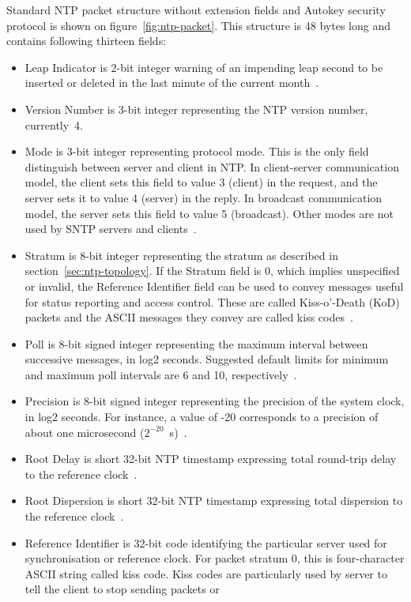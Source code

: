Standard NTP packet structure without extension fields and
Autokey security protocol is shown on figure~\ref{fig:ntp-packet}.
This structure is 48 bytes long and contains following thirteen fields:
\begin{itemize}
\item
Leap Indicator is 2-bit integer warning of an impending leap
second to be inserted or deleted in the last minute of the current
month~\cite{rfc5905}.
\item
Version Number is 3-bit integer representing the NTP
version number, currently~4.
\item
Mode is 3-bit integer representing protocol mode.
This is the only field distinguish between server and client in NTP.
In client-server communication model, the client sets this field to value 3 (client) in the request,
and the server sets it to value 4 (server) in the reply.
In broadcast communication model, the server sets this field to value 5 (broadcast).
Other modes are not used by SNTP servers and clients~\cite{rfc4330}.
\item
Stratum is 8-bit integer representing the stratum as described in section~\ref{sec:ntp-topology}.
If the Stratum field is 0, which implies unspecified or invalid, the
Reference Identifier field can be used to convey messages useful for
status reporting and access control.
These are called Kiss-o'-Death (KoD)
packets and the ASCII messages they convey are called kiss codes~\cite{rfc5905}.
\item
Poll is 8-bit signed integer representing the maximum interval between
successive messages, in log2 seconds.
Suggested default limits for minimum and maximum poll intervals are 6 and 10, respectively~\cite{rfc5905}.
\item
Precision is 8-bit signed integer representing the precision of the
system clock, in log2 seconds.
For instance, a value of -20
corresponds to a precision of about one microsecond ($2^{-20}$~s)~\cite{rfc5905}.
\item
Root Delay is short 32-bit NTP timestamp expressing
total round-trip delay to the reference clock~\cite{rfc5905}.
\item
Root Dispersion is short 32-bit NTP timestamp expressing
total dispersion to the reference clock~\cite{rfc5905}.
\item
Reference Identifier is 32-bit code identifying the particular server used for synchronisation
or reference clock.
For packet stratum 0, this is four-character ASCII string called kiss code.
Kiss codes are particularly used by server to tell the client to stop sending packets or

\end{itemize}
